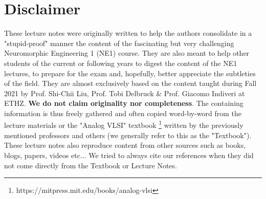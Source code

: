 \documentclass[main]{subfiles}
\begin{document}
\section*{Disclaimer}
These lecture notes were originally written to help the authors consolidate in a "stupid-proof" manner the content of the fascinating but very challenging Neuromorphic Engineering 1 (NE1) course. They are also meant to help other students of the current or following years to digest the content of the NE1 lectures, to prepare for the exam and, hopefully,  better appreciate the subtleties of the field. They are almost exclusively based on the content taught during Fall 2021 by Prof. Shi-Chii Liu, Prof. Tobi Delbruck & Prof. Giacomo Indiveri at ETHZ. \textbf{We do not claim originality nor completeness}. The containing information is thus freely gathered and often copied word-by-word from the lecture materials or the "Analog VLSI" textbook \footnote{https://mitpress.mit.edu/books/analog-vlsi} written by the previously mentioned professors and others (we generally refer to this as the "Textbook"). These lecture notes also reproduce content from other sources such as books, blogs, papers, videos etc... We tried to always cite our references when they did not come directly from the Textbook or Lecture Notes.  
\end{document}
